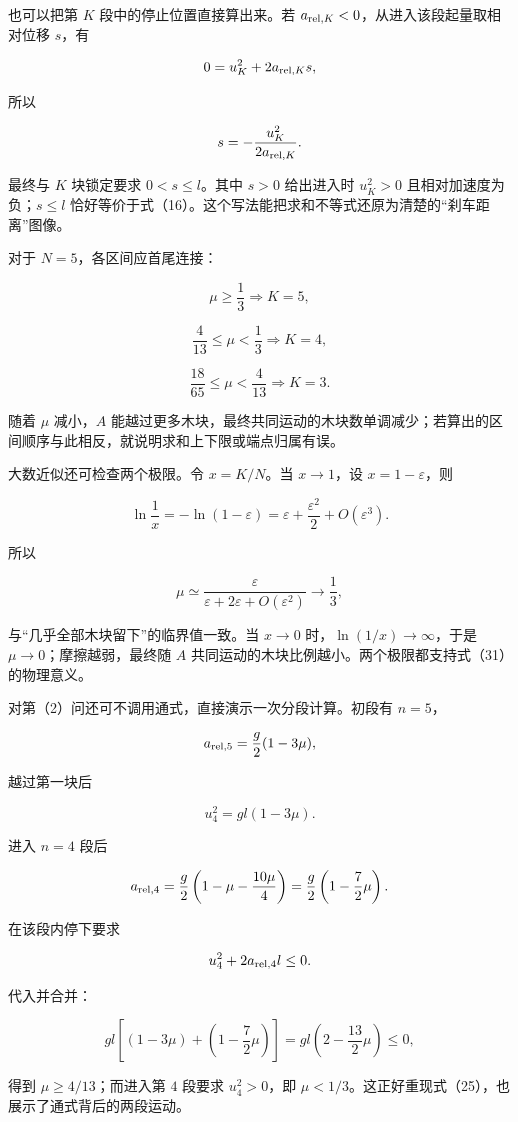\documentclass[12pt,a4paper,UTF8]{ctexart}
\begin{document}
也可以把第 \(K\) 段中的停止位置直接算出来。若
\(a_{{\rm rel},K}<0\)，从进入该段起量取相对位移 \(s\)，有

\[
0=u_K^2+2a_{{\rm rel},K}s,
\]

所以

\[
s=-\frac{u_K^2}{2a_{{\rm rel},K}}.
\]

最终与 \(K\) 块锁定要求 \(0<s\le l\)。其中 \(s>0\) 给出进入时
\(u_K^2>0\) 且相对加速度为负；\(s\le l\)
恰好等价于式（16）。这个写法能把求和不等式还原为清楚的``刹车距离''图像。

对于 \(N=5\)，各区间应首尾连接：

\[
\mu\ge\frac13\Rightarrow K=5,
\]

\[
\frac4{13}\le\mu<\frac13\Rightarrow K=4,
\]

\[
\frac{18}{65}\le\mu<\frac4{13}\Rightarrow K=3.
\]

随着 \(\mu\) 减小，\(A\)
能越过更多木块，最终共同运动的木块数单调减少；若算出的区间顺序与此相反，就说明求和上下限或端点归属有误。

大数近似还可检查两个极限。令 \(x=K/N\)。当 \(x\to1\)，设
\(x=1-\varepsilon\)，则

\[
\ln\frac1x=-\ln(1-\varepsilon)
=\varepsilon+\frac{\varepsilon^2}{2}+O(\varepsilon^3).
\]

所以

\[
\mu\simeq
\frac{\varepsilon}{\varepsilon+2\varepsilon+O(\varepsilon^2)}
\to\frac13,
\]

与``几乎全部木块留下''的临界值一致。当 \(x\to0\)
时，\(\ln(1/x)\to\infty\)，于是 \(\mu\to0\)；摩擦越弱，最终随 \(A\)
共同运动的木块比例越小。两个极限都支持式（31）的物理意义。

对第（2）问还可不调用通式，直接演示一次分段计算。初段有 \(n=5\)，

\[
a_{{\rm rel},5}=\frac g2(1-3\mu),
\]

越过第一块后

\[
u_4^2=gl(1-3\mu).
\]

进入 \(n=4\) 段后

\[
a_{{\rm rel},4}
=\frac g2\left(1-\mu-\frac{10\mu}{4}\right)
=\frac g2\left(1-\frac72\mu\right).
\]

在该段内停下要求

\[
u_4^2+2a_{{\rm rel},4}l\le0.
\]

代入并合并：

\[
gl\left[(1-3\mu)+\left(1-\frac72\mu\right)\right]
=gl\left(2-\frac{13}{2}\mu\right)\le0,
\]

得到 \(\mu\ge4/13\)；而进入第 \(4\) 段要求 \(u_4^2>0\)，即
\(\mu<1/3\)。这正好重现式（25），也展示了通式背后的两段运动。
\end{document}
